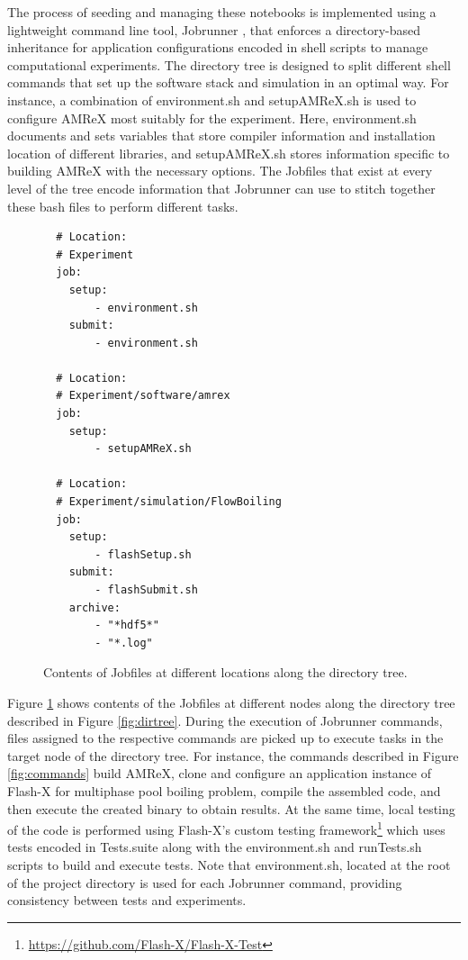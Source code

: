 \documentclass{IEEEcsmag}
\begin{document}
The process of seeding and managing these notebooks is implemented using a lightweight command line tool, Jobrunner \cite{Jobrunner}, that enforces a directory-based inheritance for application configurations encoded in shell scripts to manage computational experiments. The directory tree is designed to split different shell commands that set up the software stack and simulation in an optimal way. For instance, a combination of {environment.sh} and {setupAMReX.sh} is used to configure AMReX most suitably for the experiment. Here, {environment.sh} documents and sets variables that store compiler information and installation location of different libraries, and {setupAMReX.sh} stores information specific to building AMReX with the necessary options. {\color{red} The {Jobfiles} that exist at every level of the tree encode information that Jobrunner can use to stitch together these bash files to perform different tasks.} 
%
\begin{figure}
\begin{verbatim}
  # Location:
  # Experiment
  job:
    setup:
        - environment.sh
    submit:
        - environment.sh

  # Location:
  # Experiment/software/amrex
  job:
    setup:
        - setupAMReX.sh

  # Location: 
  # Experiment/simulation/FlowBoiling
  job:
    setup:
        - flashSetup.sh
    submit:
        - flashSubmit.sh
    archive:
        - "*hdf5*"
        - "*.log"
\end{verbatim}
\caption{Contents of {Jobfiles} at different locations along the directory tree.}
\label{fig:jobfiles}
\end{figure}

Figure \ref{fig:jobfiles} shows contents of the {Jobfiles} at different nodes along the directory tree described in Figure \ref{fig:dirtree}. During the execution of Jobrunner commands, files assigned to the respective commands are picked up to execute tasks in the target node of the directory tree. For instance, the commands described in Figure \ref{fig:commands} build AMReX, clone and configure an application instance of Flash-X for multiphase pool boiling problem, compile the assembled code, and then execute the created binary to obtain results. At the same time, local testing of the code is performed using Flash-X's custom testing framework\footnote{\url{https://github.com/Flash-X/Flash-X-Test}} which uses tests encoded in {Tests.suite} along with the {environment.sh} and {runTests.sh} scripts to build and execute tests. Note that environment.sh, located at the root of the project directory is used for each Jobrunner command, providing consistency between tests and experiments. 
\end{document}

